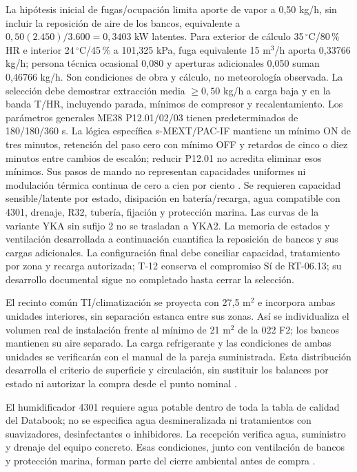 La hipótesis inicial de fugas/ocupación limita aporte de vapor a 0,50 kg/h, sin incluir la reposición de aire de los bancos, equivalente a $0,50(2.450)/3.600=0,3403$ kW latentes. Para exterior de cálculo 35\,$^{\circ}$C/80\,\% HR e interior 24\,$^{\circ}$C/45\,\% a 101,325 kPa, fuga equivalente 15 m$^3$/h aporta 0,33766 kg/h; persona técnica ocasional 0,080 y aperturas adicionales 0,050 suman 0,46766 kg/h. Son condiciones de obra y cálculo, no meteorología observada. La selección debe demostrar extracción media $\geq0,50$ kg/h a carga baja y en la banda T/HR, incluyendo parada, mínimos de compresor y recalentamiento. Los parámetros generales ME38 P12.01/02/03 tienen predeterminados de 180/180/360 s. La lógica específica s-MEXT/PAC-IF mantiene un mínimo ON de tres minutos, retención del paso cero con mínimo OFF y retardos de cinco o diez minutos entre cambios de escalón; reducir P12.01 no acredita eliminar esos mínimos. Sus pasos de mando no representan capacidades uniformes ni modulación térmica continua de cero a cien por ciento \parencite[pp.~139--140 y tabla P12.01--03]{p6-mext-control-me38}. Se requieren capacidad sensible/latente por estado, disipación en batería/recarga, agua compatible con 4301, drenaje, R32, tubería, fijación y protección marina. Las curvas de la variante YKA sin sufijo 2 no se trasladan a YKA2. La memoria de estados y ventilación desarrollada a continuación cuantifica la reposición de bancos y sus cargas adicionales. La configuración final debe conciliar capacidad, tratamiento por zona y recarga autorizada; T-12 conserva el compromiso Sí de RT-06.13; su desarrollo documental sigue no completado hasta cerrar la selección.

El recinto común TI/climatización se proyecta con 27,5 m$^2$ e incorpora ambas unidades interiores, sin separación estanca entre sus zonas. Así se individualiza el volumen real de instalación frente al mínimo de 21 m$^2$ de la 022 F2; los bancos mantienen su aire separado. La carga refrigerante y las condiciones de ambas unidades se verificarán con el manual de la pareja suministrada. Esta distribución desarrolla el criterio de superficie y circulación, sin sustituir los balances por estado ni autorizar la compra desde el punto nominal \parencite[secc.~2.2.6--2.2.7, p.~21]{p9-mext-manual-2024}.

El humidificador 4301 requiere agua potable dentro de toda la tabla de calidad del Databook; no se especifica agua desmineralizada ni tratamientos con suavizadores, desinfectantes o inhibidores. La recepción verifica agua, suministro y drenaje del equipo concreto. Esas condiciones, junto con ventilación de bancos y protección marina, forman parte del cierre ambiental antes de compra \parencite[p.~42]{p6-mext-databook}.




